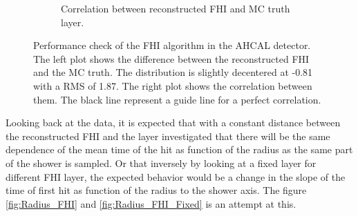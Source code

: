 \begin{figure}[htbp!]
\begin{subfigure}[t]{0.5\textwidth}
		\caption{Correlation between reconstructed FHI and MC truth layer.}\label{fig:Corr_FHI_RecoMC}
	\end{subfigure}
	\caption{Performance check of the FHI algorithm in the AHCAL detector. The left plot shows the difference between the reconstructed FHI and the MC truth. The distribution is slightly decentered at -0.81 with a RMS of 1.87. The right plot shows the correlation between them. The black line represent a guide line for a perfect correlation.}
	\label{fig:FHIAlgo}
\end{figure}

Looking back at the data, it is expected that with a constant distance between the reconstructed FHI and the layer investigated that there will be the same dependence of the mean time of the hit as function of the radius as the same part of the shower is sampled. Or that inversely by looking at a fixed layer for different FHI layer, the expected behavior would be a change in the slope of the time of first hit as function of the radius to the shower axis. The figure \ref{fig:Radius_FHI} and \ref{fig:Radius_FHI_Fixed} is an attempt at this.

